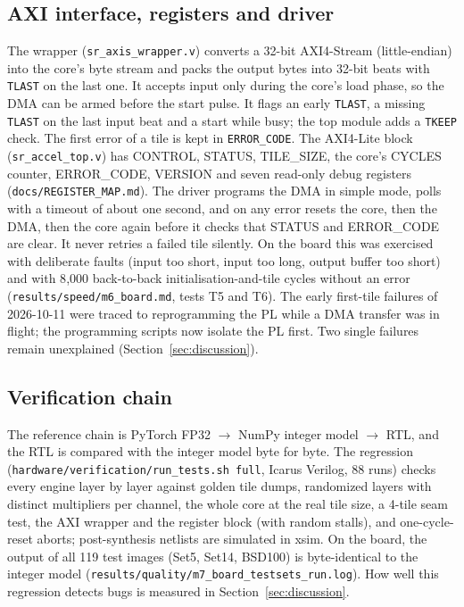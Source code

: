 \documentclass[conference]{IEEEtran}
\begin{document}
\subsection{AXI interface, registers and driver}
The wrapper (\texttt{sr\_axis\_wrapper.v}) converts a 32-bit AXI4-Stream (little-endian) into the core's byte stream and packs the output bytes into 32-bit beats with \texttt{TLAST} on the last one. It accepts input only during the core's load phase, so the DMA can be armed before the start pulse.
It flags an early \texttt{TLAST}, a missing \texttt{TLAST} on the last input beat and a start while busy; the top module adds a \texttt{TKEEP} check. The first error of a tile is kept in \texttt{ERROR\_CODE}.
The AXI4-Lite block (\texttt{sr\_accel\_top.v}) has CONTROL, STATUS, TILE\_SIZE, the core's CYCLES counter, ERROR\_CODE, VERSION and seven read-only debug registers (\texttt{docs/\allowbreak{}REGISTER\_MAP.md}).
The driver programs the DMA in simple mode, polls with a timeout of about one second, and on any error resets the core, then the DMA, then the core again before it checks that STATUS and ERROR\_CODE are clear. It never retries a failed tile silently.
On the board this was exercised with deliberate faults (input too short, input too long, output buffer too short) and with 8{,}000 back-to-back initialisation-and-tile cycles without an error (\texttt{results/\allowbreak{}speed/\allowbreak{}m6\_board.md}, tests T5 and T6).
The early first-tile failures of 2026-10-11 were traced to reprogramming the PL while a DMA transfer was in flight; the programming scripts now isolate the PL first. Two single failures remain unexplained (Section~\ref{sec:discussion}).

\subsection{Verification chain}
The reference chain is PyTorch FP32 $\to$ NumPy integer model $\to$ RTL, and the RTL is compared with the integer model byte for byte. The regression (\texttt{hardware/\allowbreak{}verification/\allowbreak{}run\_tests.sh full}, Icarus Verilog, 88 runs) checks every engine layer by layer against golden tile dumps, randomized layers with distinct multipliers per channel, the whole core at the real tile size, a 4-tile seam test, the AXI wrapper and the register block (with random stalls), and one-cycle-reset aborts; post-synthesis netlists are simulated in xsim.
On the board, the output of all 119 test images (Set5, Set14, BSD100) is byte-identical to the integer model (\texttt{results/\allowbreak{}quality/\allowbreak{}m7\_board\_testsets\_run.log}).
How well this regression detects bugs is measured in Section~\ref{sec:discussion}.
\end{document}
